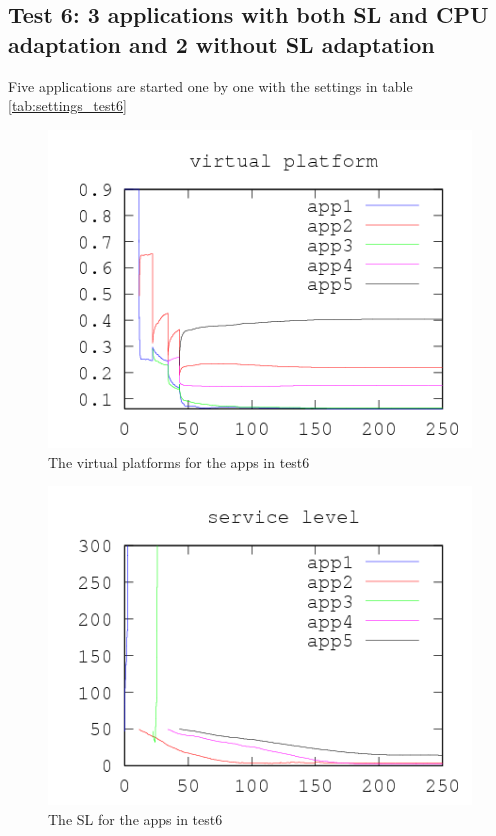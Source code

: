 \documentclass[nobiblatex]{LTHthesis}
\begin{document}
\subsection{Test 6: 3 applications with both SL and CPU adaptation and 2 without SL adaptation}
Five applications are started one by one with the settings in table \ref{tab:settings_test6}


\begin{figure}[!H]
  \centering
  \includegraphics{"tools/plot/logs/test6/vp"}
  \caption{The virtual platforms for the apps in test6}
  \label{fig:test6_vp}
\end{figure}

\begin{figure}[!H]
  \centering
  \includegraphics{"tools/plot/logs/test6/sl"}
  \caption{The SL for the apps in test6}
  \label{fig:test6_sl}
\end{figure}
\end{document}
